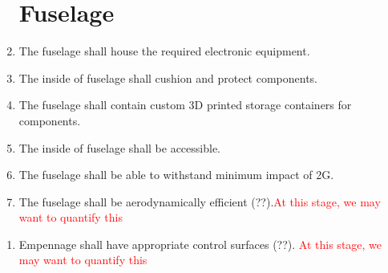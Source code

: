 \documentclass{article}
\begin{document}
	\begin{enumerate}
		
		\section{Fuselage}
		
		\item The fuselage shall house the required electronic equipment.\\
		\item The inside of fuselage shall cushion and protect components.\\
		\item The fuselage shall contain custom 3D printed storage containers for components.\\
		\item The inside of fuselage shall be accessible.\\
		\item The fuselage shall be able to withstand minimum impact of 2G.\\
		\item The fuselage shall be aerodynamically efficient (??).\textcolor{red}{At this stage, we may want to quantify this}\\
	
	\end{enumerate}

	\begin{enumerate}
		
		\section{Empennage}
		
		\item Empennage shall have appropriate control surfaces (??). \textcolor{red}{At this stage, we may want to quantify this}\\
		
	\end{enumerate}
\end{document}
